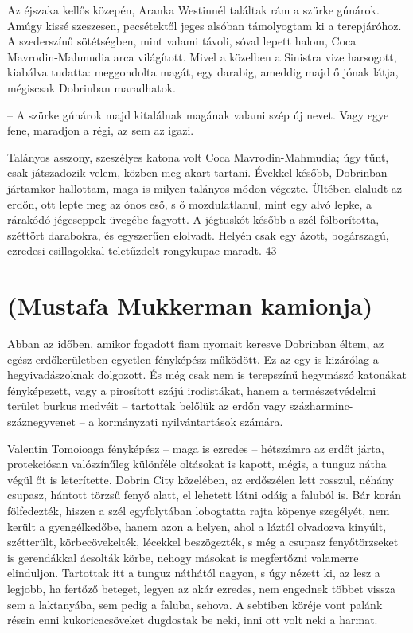 \documentclass{IEEEtran}
\begin{document}
Az éjszaka kellős közepén, Aranka Westinnél találtak rám a szürke gúnárok.
Amúgy kissé szeszesen, pecsétektől jeges alsóban támolyogtam ki a
terepjáróhoz. A szederszínű sötétségben, mint valami távoli, sóval lepett
halom, Coca Mavrodin-Mahmudia arca világított. Mivel a közelben a Sinistra
vize harsogott, kiabálva tudatta: meggondolta magát, egy darabig, ameddig majd
ő jónak látja, mégiscsak Dobrinban maradhatok.

– A szürke gúnárok majd kitalálnak magának valami szép új nevet. Vagy egye
fene, maradjon a régi, az sem az igazi.

Talányos asszony, szeszélyes katona volt Coca Mavrodin-Mahmudia; úgy tűnt,
csak játszadozik velem, közben meg akart tartani. Évekkel később, Dobrinban
jártamkor hallottam, maga is milyen talányos módon végezte. Ültében elaludt az
erdőn, ott lepte meg az ónos eső, s ő mozdulatlanul, mint egy alvó lepke, a
rárakódó jégcseppek üvegébe fagyott. A jégtuskót később a szél fölborította,
széttört darabokra, és egyszerűen elolvadt. Helyén csak egy ázott, bogárszagú,
ezredesi csillagokkal teletűzdelt rongykupac maradt.
43
\section{(Mustafa Mukkerman kamionja)}

Abban az időben, amikor fogadott fiam nyomait keresve Dobrinban éltem, az
egész erdőkerületben egyetlen fényképész működött. Ez az egy is kizárólag a
hegyivadászoknak dolgozott. És még csak nem is terepszínű hegymászó katonákat
fényképezett, vagy a pirosított szájú irodistákat, hanem a természetvédelmi
terület burkus medvéit – tartottak belőlük az erdőn vagy
százharminc-száznegyvenet – a kormányzati nyilvántartások számára.

Valentin Tomoioaga fényképész – maga is ezredes – hétszámra az erdőt járta,
protekciósan valószínűleg különféle oltásokat is kapott, mégis, a tunguz nátha
végül őt is leterítette. Dobrin City közelében, az erdőszélen lett rosszul,
néhány csupasz, hántott törzsű fenyő alatt, el lehetett látni odáig a faluból
is. Bár korán fölfedezték, hiszen a szél egyfolytában lobogtatta rajta köpenye
szegélyét, nem került a gyengélkedőbe, hanem azon a helyen, ahol a láztól
olvadozva kinyúlt, szétterült, körbecövekelték, lécekkel beszögezték, s még a
csupasz fenyőtörzseket is gerendákkal ácsolták körbe, nehogy másokat is
megfertőzni valamerre elinduljon. Tartottak itt a tunguz náthától nagyon, s
úgy nézett ki, az lesz a legjobb, ha fertőző beteget, legyen az akár ezredes,
nem engednek többet vissza sem a laktanyába, sem pedig a faluba, sehova. A
sebtiben köréje vont palánk résein enni kukoricacsöveket dugdostak be neki,
inni ott volt neki a harmat.
\end{document}

